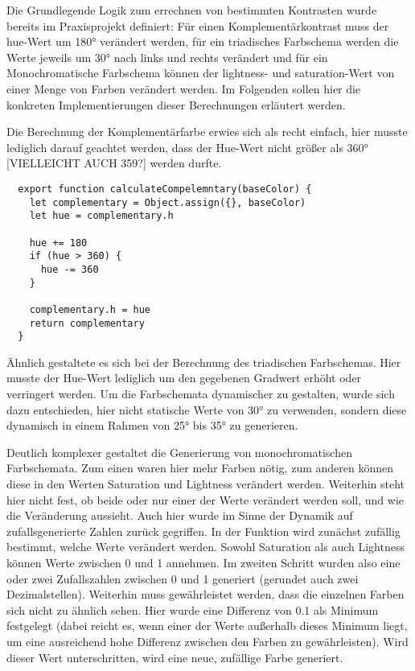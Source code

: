 Die Grundlegende Logik zum errechnen von bestimmten Kontrasten wurde bereits im Praxisprojekt definiert: Für einen Komplementärkontrast muss der hue-Wert um 180° verändert werden, für ein triadisches Farbschema werden die Werte jeweils um 30° nach links und rechts verändert und für ein Monochromatische Farbschema können der lightness- und saturation-Wert von einer Menge von Farben verändert werden.
Im Folgenden sollen hier die konkreten Implementierungen dieser Berechnungen erläutert werden.

Die Berechnung der Komplementärfarbe erwies sich als recht einfach, hier musste lediglich darauf geachtet werden, dass der Hue-Wert nicht größer als 360° [VIELLEICHT AUCH 359?] werden durfte.


\begin{lstlisting}
  export function calculateCompelemntary(baseColor) {
    let complementary = Object.assign({}, baseColor)
    let hue = complementary.h

    hue += 180
    if (hue > 360) {
      hue -= 360
    }

    complementary.h = hue
    return complementary
  }
\end{lstlisting}

Ähnlich gestaltete es sich bei der Berechnung des triadischen Farbschemas. Hier musste der Hue-Wert lediglich um den gegebenen Gradwert erhöht oder verringert werden. Um die Farbschemata dynamischer zu gestalten, wurde sich dazu entschieden, hier nicht statische Werte von 30° zu verwenden, sondern diese dynamisch in einem Rahmen von 25° bis 35° zu generieren.

Deutlich komplexer gestaltet die Generierung von monochromatischen Farbschemata. Zum einen waren hier mehr Farben nötig, zum anderen können diese in den Werten Saturation und Lightness verändert werden. Weiterhin steht hier nicht fest, ob beide oder nur einer der Werte verändert werden soll, und wie die Veränderung aussieht. Auch hier wurde im Sinne der Dynamik auf zufallsgenerierte Zahlen zurück gegriffen.
In der Funktion wird zunächst zufällig bestimmt, welche Werte verändert werden. Sowohl Saturation als auch Lightness können Werte zwischen 0 und 1 annehmen. Im zweiten Schritt wurden also eine oder zwei Zufallszahlen zwischen 0 und 1 generiert (gerundet auch zwei Dezimalstellen).
Weiterhin muss gewährleistet werden, dass die einzelnen Farben sich nicht zu ähnlich sehen. Hier wurde eine Differenz von 0.1 als Minimum festgelegt (dabei reicht es, wenn einer der Werte außerhalb dieses Minimum liegt, um eine ausreichend hohe Differenz zwischen den Farben zu gewährleisten). Wird dieser Wert unterschritten, wird eine neue, zufällige Farbe generiert.

